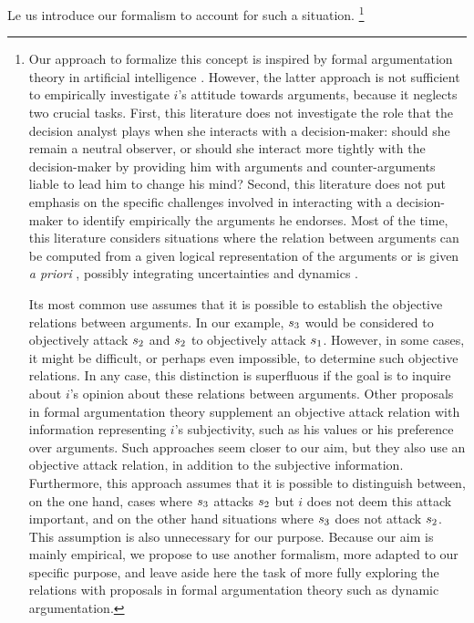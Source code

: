 \documentclass[version=3.21, pagesize, twoside=off, bibliography=totoc, DIV=calc, fontsize=12pt, a4paper]{scrartcl}
\begin{document}
Le us introduce our formalism to account for such a situation.%
\footnote{Our approach to formalize this concept is inspired by formal argumentation theory in artificial intelligence \citep{dung_acceptability_1995, rahwan_argumentation_2009}. However, the latter approach is not sufficient to empirically investigate $i$'s attitude towards arguments, because it neglects two crucial tasks.
First, this literature does not investigate the role that the decision analyst plays when she interacts with a decision-maker: should she remain a neutral observer, or should she interact more tightly with the decision-maker by providing him with arguments and counter-arguments liable to lead him to change his mind? 
Second, this literature does not put emphasis on the specific challenges involved in interacting with a decision-maker to identify empirically the arguments he endorses. Most of the time, this literature considers situations where the relation between arguments can be computed from a given logical representation of the arguments \citep{besnard_elements_2008} or is given \emph{a priori} \citep{baroni_semantics_2009}, possibly integrating uncertainties \citep{hunter_probabilistic_2014} and dynamics \citep{rotstein_dynamic_2010, marcos_dynamic_2011, dimopoulos_control_2018}.

Its most common use assumes that it is possible to establish the objective relations between arguments. In our example, $s_3$ would be considered to objectively attack $s_2$ and $s_2$ to objectively attack $s_1$. However, in some cases, it might be difficult, or perhaps even impossible, to determine such objective relations. In any case, this distinction is superfluous if the goal is to inquire about $i$’s opinion about these relations between arguments.
Other proposals in formal argumentation theory \citep{amgoud_reasoning_2002, bench-capon_persuasion_2003, amgoud_making_2008, amgoud_using_2009, bench-capon_abstract_2009, ferretti_approach_2017} supplement an objective attack relation with information representing $i$’s subjectivity, such as his values or his preference over arguments. Such approaches seem closer to our aim, but they also use an objective attack relation, in addition to the subjective information. Furthermore, this approach assumes that it is possible to distinguish between, on the one hand, cases where $s_3$ attacks $s_2$ but $i$ does not deem this attack important, and on the other hand situations where $s_3$ does not attack $s_2$. This assumption is also unnecessary for our purpose. Because our aim is mainly empirical, we propose to use another formalism, more adapted to our specific purpose, and leave aside here the task of more fully exploring the relations with proposals in formal argumentation theory such as dynamic argumentation.}
%
\end{document}
